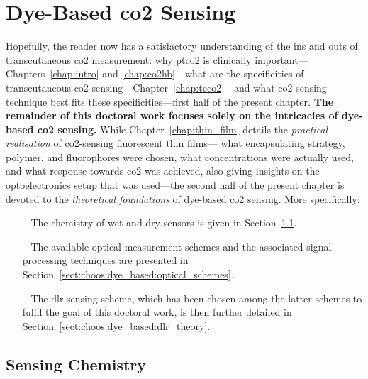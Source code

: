 \section{Dye-Based \texorpdfstring{\gls{co2}}{CO2} Sensing}\label{sect:choos:dye_based}

Hopefully, the reader now has a satisfactory understanding of the ins and outs of transcutaneous \gls{co2} measurement: why \gls{ptco2} is clinically important---Chapters~\ref{chap:intro} and \ref{chap:co2hb}---what are the specificities of transcutaneous \gls{co2} sensing---Chapter~\ref{chap:tcco2}---and what \gls{co2} sensing technique best fits these specificities---first half of the present chapter. \textbf{The remainder of this doctoral work focuses solely on the intricacies of dye-based \gls{co2} sensing.} While Chapter~\ref{chap:thin_film} details the \emph{practical realisation} of \gls{co2}-sensing fluorescent thin films---\ie{} what encapsulating strategy, polymer, and fluorophores were chosen, what concentrations were actually used, and what response towards \gls{co2} was achieved, also giving insights on the optoelectronics setup that was used---the second half of the present chapter is devoted to the \emph{theoretical foundations} of dye-based \gls{co2} sensing. More specifically:
\begin{itemize}
	\item[--] The chemistry of wet and dry sensors is given in Section~\ref{sect:choos:dye_based:chemistry}.
	\item[--] The available optical measurement schemes and the associated signal processing techniques are presented in Section~\ref{sect:choos:dye_based:optical_schemes}.
	\item[--] The \gls{dlr} sensing scheme, which has been chosen among the latter schemes to fulfil the goal of this doctoral work, is then further detailed in Section~\ref{sect:choos:dye_based:dlr_theory}.
\end{itemize}

\subsection{Sensing Chemistry}\label{sect:choos:dye_based:chemistry}

